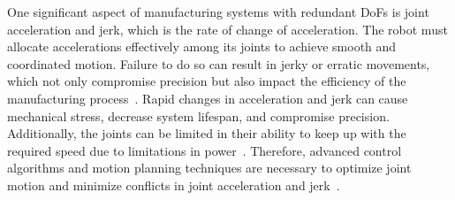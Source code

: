 









One significant aspect of manufacturing systems with redundant \acrshort{DoF}s is joint acceleration and jerk, which is the rate of change of acceleration. The robot must allocate accelerations effectively among its joints to achieve smooth and coordinated motion. Failure to do so can result in jerky or erratic movements, which not only compromise precision but also impact the efficiency of the manufacturing process~\cite{Duong.2021}. Rapid changes in acceleration and jerk can cause mechanical stress, decrease system lifespan, and compromise precision. Additionally, the joints can be limited in their ability to keep up with the required speed due to limitations in power~\cite{Staff.1988}. Therefore, advanced control algorithms and motion planning techniques are necessary to optimize joint motion and minimize conflicts in joint acceleration and jerk~\cite{Duong.2021, Valente.2017}.

